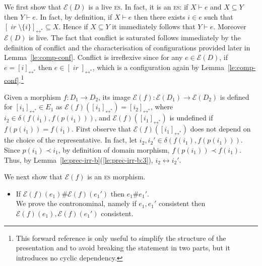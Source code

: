 \documentclass[conference]{IEEEtran}
\renewenvironment{proof}{\begin{IEEEproof}}{\end{IEEEproof}}
\newcommand{\compact}[1]{\ensuremath{\mathop{\mathsf{K}({#1})}}}
\newcommand{\ir}[1]{\ensuremath{\mathop{\mathit{ir}({#1})}}}
\newcommand{\diff}[2]{\ensuremath{\delta({#1},{#2})}}
\newcommand{\esabbr}{\textsc{es}}
\newcommand{\pred}[1]{\ensuremath{\mathit{p}({#1})}}
\newcommand{\eqclass}[2][]{\ensuremath{[{#2}]_{\scriptscriptstyle {#1}}}}
\newcommand{\eqclassir}[1]{\ensuremath{\eqclass[\leftrightarrow^*]{#1}}}
\newcommand{\zev}[0]{\ensuremath{\mathcal{E}}}
\newcommand{\ev}[1]{\ensuremath{\zev({#1})}}
\begin{document}
\begin{proof}

  

  We first show that $\ev{D}$ is a live {\esabbr}. In fact, it is an
  {\esabbr}: if $X \vdash e$ and $X \subseteq Y$ then
  $Y \vdash e$. In fact, by definition, if $X \vdash e$ then there
  exists $i \in e$ such that
  $\eqclassir{\ir{i} \setminus \{i\}} \subseteq X$. Hence if
  $X \subseteq Y$ it immediately follows that $Y \vdash e$.
  Moreover $\ev{D}$ is live. The fact that conflict is saturated
  follows immediately by the definition of conflict and the
  characterisation of configurations provided later in
  Lemma~\ref{le:comp-conf}. Conflict is irreflexive since for any
  $e \in \ev{D}$, if $e = \eqclassir{i}$ then
  $e \in \eqclassir{\ir{i}}$, which is a configuration again by
  Lemma~\ref{le:comp-conf}.\footnote{This forward reference is only
    useful to simplify the structure of the presentation and to avoid
    breaking the statement in two parts, but it
    introduces no cyclic dependency.}

  \bigskip

  Given a morphism $f : D_1 \to D_2$, its image
  $\ev{f} : \ev{D_1} \to \ev{D_2}$ is defined for
  $\eqclassir{i_1} \in {E_1}$ as
  $\ev{f}(\eqclassir{i_1})= \eqclassir{i_2}$,
  where $i_2 \in \diff{f(i_1)}{f(\pred{i_1})}$, and
  $\ev{f}(\eqclassir{i_1})$ is undefined if $f(\pred{i_1}) = f(i_1)$.
  First observe that $\ev{f}(\eqclassir{i_1})$ does
  not depend on the choice of the representative. In fact, let
  $i_2, i_2' \in \diff{f(i_1)}{f(\pred{i_1})}$.  Since
  $\pred{i_1} \prec i_1$, by definition of domain morphism,
  $f(\pred{i_1}) \prec f(i_1)$. Thus, by
  Lemma~\ref{le:prec-irr-b}(\ref{le:prec-irr-b:3}),
  $i_2 \leftrightarrow i_2'$.  

  We next show that $\ev{f}$ is an {\esabbr} morphism.
  \begin{itemize}
  \item If $\ev{f}(e_1) \# \ev{f}(e_1')$ then $e_1 \# e_1'$.\\
    We prove the contronominal, namely if $e_1,e_1'$ consistent
    then $\ev{f}(e_1),\ev{f}(e_1')$ consistent.


\end{itemize}
\end{proof}
\end{document}
